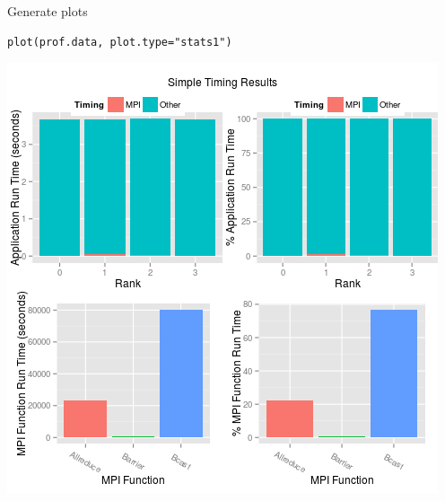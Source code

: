 \begin{frame}[fragile]
  \begin{block}{Generate plots}
  \begin{center}\vspace{-.6cm}
\begin{lstlisting}
plot(prof.data, plot.type="stats1")
\end{lstlisting}\vspace{-.2cm}
\includegraphics[scale=.39]{../common/pics/prof/timing.png}
\end{center}
  \end{block}
\end{frame}


